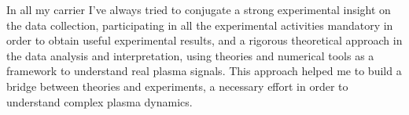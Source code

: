 {%

In all my carrier I've always tried to conjugate a strong experimental
insight on the data collection, participating in all the experimental
activities mandatory in order to obtain useful experimental results, and a rigorous theoretical approach in
the data analysis and interpretation, using theories and numerical
tools as a framework to understand real plasma signals. This
approach helped me to build a bridge between theories and experiments,
a necessary effort in order to understand complex plasma dynamics.

\printbibliography[type=article,  title = {Cited publications}, heading=subbibliography, prefixnumbers={A}, resetnumbers=true]
}
